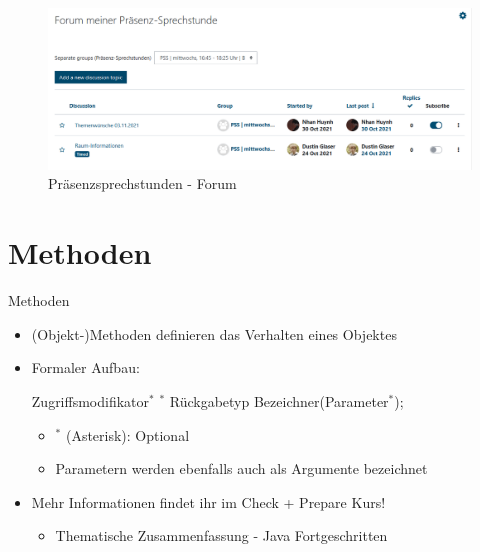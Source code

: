 \documentclass{../tuda-beamer}
\begin{document}
  \begin{frame}[c]
    \begin{figure}[h]
      \centering
      \includegraphics[width=\linewidth]{graphics/pss_themenwuensche.png}
      \caption{Präsenzsprechstunden - Forum}
    \end{figure}
  \end{frame}


  \section{Methoden}
  \begin{frame}{Methoden}
    \begin{itemize}
      \item (Objekt-)Methoden definieren das Verhalten eines Objektes
      \item Formaler Aufbau:

      \begin{center}
        Zugriffsmodifikator\(^*\)  \(^*\)  Rückgabetyp Bezeichner(Parameter\(^*\));
      \end{center}

      \begin{itemize}
        \item \(^*\) (Asterisk): Optional
        \item Parametern werden ebenfalls auch als Argumente bezeichnet
      \end{itemize}
      \item Mehr Informationen findet ihr im Check + Prepare Kurs!
      \begin{itemize}
        \item Thematische Zusammenfassung -  Java Fortgeschritten
      \end{itemize}
    \end{itemize}
  \end{frame}

  \begin{frame}
    
  \end{frame}
\end{document}
